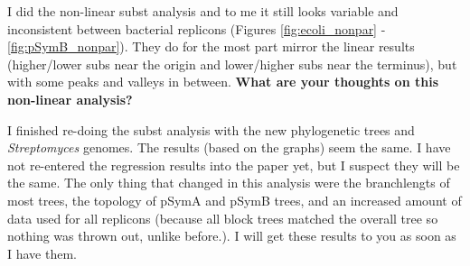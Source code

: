 \documentclass[12pt]{article}
\newcommand{\smel}{\textit{S.\,meliloti}\xspace}
\newcommand{\strep}{\textit{Streptomyces}\xspace}
\newcommand{\ecoli}{\textit{Escherichia coli}\xspace}
\newcommand{\pa}{pSymA\xspace}
\newcommand{\pb}{pSymB\xspace}
\begin{document}
I did the non-linear subst analysis and to me it still looks variable and inconsistent between bacterial replicons (Figures \ref{fig:ecoli_nonpar} - \ref{fig:pSymB_nonpar}).
They do for the most part mirror the linear results (higher/lower subs near the origin and lower/higher subs near the terminus), but with some peaks and valleys in between.
\textbf{What are your thoughts on this non-linear analysis?}

I finished re-doing the subst analysis with the new phylogenetic trees and \strep genomes.
The results (based on the graphs) seem the same. I have not re-entered the regression results into the paper yet, but I suspect they will be the same.
The only thing that changed in this analysis were the branchlengts of most trees, the topology of \pa and \pb trees, and an increased amount of data used for all replicons (because all block trees matched the overall tree so nothing was thrown out, unlike before.).
I will get these results to you as soon as I have them.








%
%
%
\end{document}
